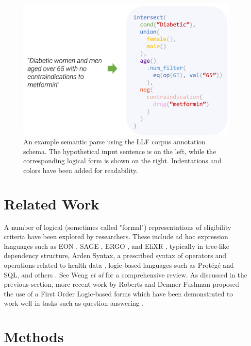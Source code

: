 \documentclass[../main.tex]{subfiles}
\begin{document}
\begin{figure}[h!]
  \centering
  \includegraphics[scale=0.6]{Figures/4_llf_corpus/semantic_parse.png}  
\caption{An example semantic parse using the LLF corpus annotation schema. The hypothetical input sentence is on the left, while the corresponding logical form is shown on the right. Indentations and colors have been added for readability.}
\label{fig_semantic_parse}
\end{figure}

\section{Related Work}

A number of logical (sometimes called "formal") representations of eligibility criteria have been explored by researchers. These include ad hoc expression languages such as EON \cite{musen1996eon}, SAGE \cite{tu2007sage}, ERGO \cite{sim2004ontology}, and EliXR \cite{weng2011elixr}, typically in tree-like dependency structure, Arden Syntax, a prescribed syntax of operators and operations related to health data \cite{hulse1976computerized}, logic-based languages such as Protégé \cite{musen2015protege} and SQL, and others \cite{sordo2004description,miksch1997asbru,o2002chronus}. See Weng \textit{et al} \cite{weng2010formal} for a comprehensive review. As discussed in the previous section, more recent work by Roberts and Demner-Fushman proposed the use of a First Order Logic-based forms \cite{roberts2016annotating} which have been demonstrated to work well in tasks such as question answering \cite{soni2023quehry}.

\section{Methods}
\end{document}
